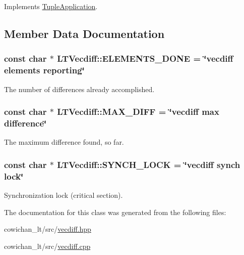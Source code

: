 Implements \hyperlink{class_tuple_application_ef6ae8bb1d697e4ed038b43320183c89}{TupleApplication}.

\subsection{Member Data Documentation}
\hypertarget{class_l_t_vecdiff_552dd71094bbdd099775890405a05221}{
\subsubsection[{ELEMENTS\_\-DONE}]{\setlength{\rightskip}{0pt plus 5cm}const char $\ast$ {\bf LTVecdiff::ELEMENTS\_\-DONE} = \char`\"{}vecdiff elements reporting\char`\"{}}}
\label{class_l_t_vecdiff_552dd71094bbdd099775890405a05221}


The number of differences already accomplished. \hypertarget{class_l_t_vecdiff_4eecee406e18ced8eef15dfc074d9a55}{
\subsubsection[{MAX\_\-DIFF}]{\setlength{\rightskip}{0pt plus 5cm}const char $\ast$ {\bf LTVecdiff::MAX\_\-DIFF} = \char`\"{}vecdiff max difference\char`\"{}}}
\label{class_l_t_vecdiff_4eecee406e18ced8eef15dfc074d9a55}


The maximum difference found, so far. \hypertarget{class_l_t_vecdiff_251e456901f73b685b41a3826c3a5f8c}{
\subsubsection[{SYNCH\_\-LOCK}]{\setlength{\rightskip}{0pt plus 5cm}const char $\ast$ {\bf LTVecdiff::SYNCH\_\-LOCK} = \char`\"{}vecdiff synch lock\char`\"{}}}
\label{class_l_t_vecdiff_251e456901f73b685b41a3826c3a5f8c}


Synchronization lock (critical section). 

The documentation for this class was generated from the following files:\begin{CompactItemize}
\item 
cowichan\_\-lt/src/\hyperlink{vecdiff_8hpp}{vecdiff.hpp}\item 
cowichan\_\-lt/src/\hyperlink{cowichan__lt_2src_2vecdiff_8cpp}{vecdiff.cpp}\end{CompactItemize}
